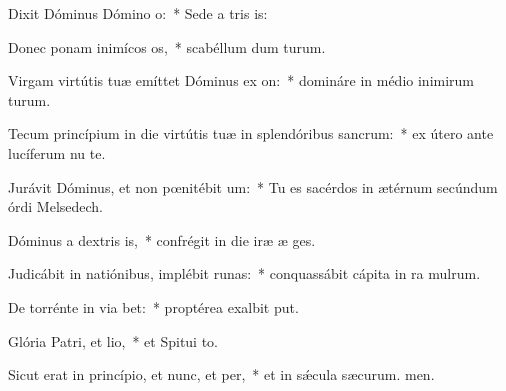 \item Dixit Dóminus Dómino o:~* Sede a tris is:
\item Donec ponam inimícos os,~* scabéllum dum turum.
\item Virgam virtútis tuæ emíttet Dóminus ex on:~* domináre in médio inimirum turum.
\item Tecum princípium in die virtútis tuæ in splendóribus sancrum:~* ex útero ante lucíferum nu te.
\item Jurávit Dóminus, et non pœnitébit um:~* Tu es sacérdos in ætérnum secúndum órdi Melsedech.
\item Dóminus a dextris is,~* confrégit in die iræ æ ges.
\item Judicábit in natiónibus, implébit runas:~* conquassábit cápita in ra mulrum.
\item De torrénte in via bet:~* proptérea exalbit put.
\item Glória Patri, et lio,~* et Spitui to.
\item Sicut erat in princípio, et nunc, et per,~* et in sǽcula sæcurum. men.

